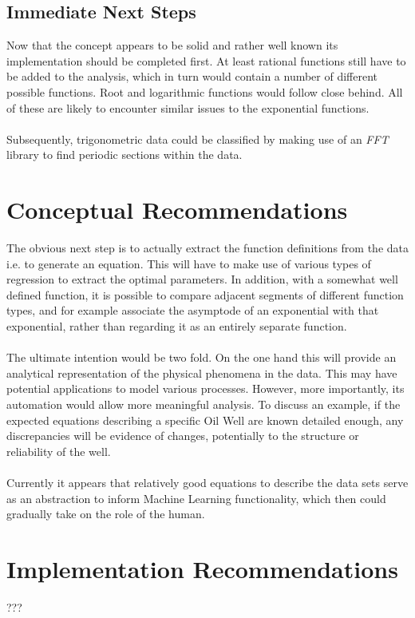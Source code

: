 \documentclass[main.tex]{subfiles}
\begin{document}
    \subsection{Immediate Next Steps}
      
      Now that the concept appears to be solid and rather well known its implementation should be completed first. At least rational functions still have to be added to the analysis, which in turn would contain a number of different possible functions. Root and logarithmic functions would follow close behind. All of these are likely to encounter similar issues to the exponential functions.
      \\\\
      Subsequently, trigonometric data could be classified by making use of an \textit{FFT} library to find periodic sections within the data. 
        
  \section{Conceptual Recommendations}
    
    The obvious next step is to actually extract the function definitions from the data i.e. to generate an equation. This will have to make use of various types of regression to extract the optimal parameters. In addition, with a somewhat well defined function, it is possible to compare adjacent segments of different function types, and for example associate the asymptode of an exponential with that exponential, rather than regarding it as an entirely separate function.
    \\\\
    The ultimate intention would be two fold. On the one hand this will provide an analytical representation of the physical phenomena in the data. This may have potential applications to model various processes. However, more importantly, its automation would allow more meaningful analysis. To discuss an example, if the expected equations describing a specific Oil Well are known detailed enough, any discrepancies will be evidence of changes, potentially to the structure or reliability of the well.
    \\\\
    Currently it appears that relatively good equations to describe the data sets serve as an abstraction to inform Machine Learning functionality, which then could gradually take on the role of the human.
    
  \section{Implementation Recommendations}
    
    ???
    
\end{document}
